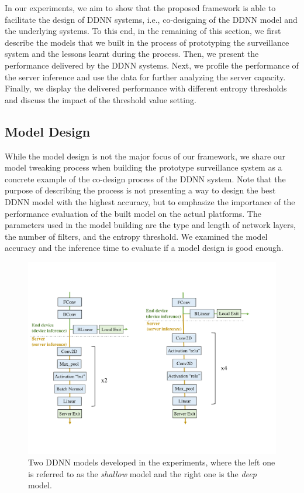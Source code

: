 \documentclass[conference]{IEEEtran}
\begin{document}
In our experiments, we aim to show that the proposed framework is able to facilitate the design of DDNN systems, i.e., co-designing of the DDNN model and the underlying systems. To this end, in the remaining of this section, we first describe the models that we built in the process of prototyping the surveillance system and the lessons learnt during the process. Then, we present the performance delivered by the DDNN systems. Next, we profile the performance of the server inference and use the data for further analyzing the server capacity. Finally, we display the delivered performance with different entropy thresholds and discuss the impact of the threshold value setting.


\subsection{Model Design}
\label{sec:modeldesign}

While the model design is not the major focus of our framework, we share our model tweaking process when building the prototype surveillance system as a concrete example of the co-design process of the DDNN system. Note that the purpose of describing the process is not presenting a way to design the best DDNN model with the highest accuracy, but to emphasize the importance of the performance evaluation of the built model on the actual platforms. The parameters used in the model building are the type and length of network layers, the number of filters, and the entropy threshold. We examined the model accuracy and the inference time to evaluate if a model design is good enough.

	\begin{figure}[tbh!!]
        \centering

        \includegraphics[width=\columnwidth]{figure/cifar10_weak_good.pdf}

        \caption{Two DDNN models developed in the experiments, where the left one is referred to as the \emph{shallow} model and the right one is the \emph{deep} model.}
        \label{fig:cifarmodels} %
    \end{figure}
\end{document}

